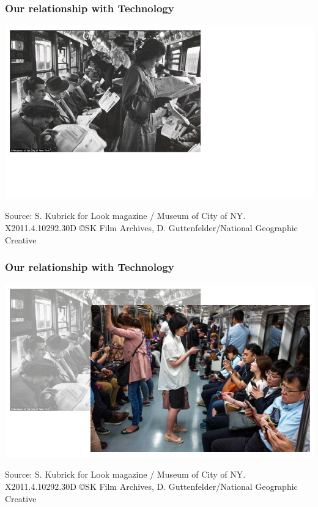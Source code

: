 \begin{frame}
\frametitle{Our relationship with Technology}
\vskip 1.15cm
\begin{center}
    \includegraphics[width=1.0\textwidth]{./pictures/OldTime.png}
\end{center}
\tiny{Source: S. Kubrick for Look magazine / Museum of City of NY. X2011.4.10292.30D ©SK Film Archives, D. Guttenfelder/National Geographic Creative}
\end{frame}

\begin{frame}
\frametitle{Our relationship with Technology}
\vskip 1.08cm
\begin{center}
    \includegraphics[width=1.0\textwidth]{./pictures/NewTime.png}
\end{center}
\tiny{Source: S. Kubrick for Look magazine / Museum of City of NY. X2011.4.10292.30D ©SK Film Archives, D. Guttenfelder/National Geographic Creative}
\end{frame}

